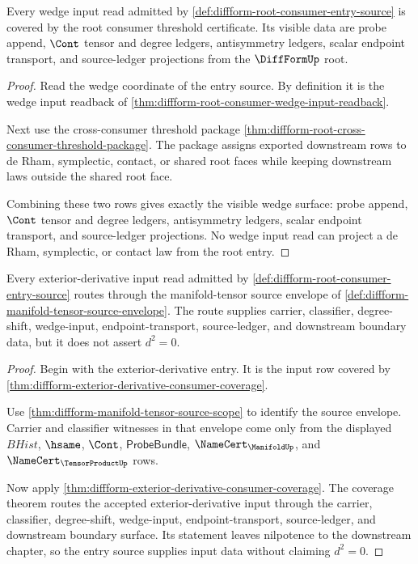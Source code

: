 \begin{theorem}
\label{thm:diffform-root-consumer-entry-wedge}
Every wedge input read admitted by
\autoref{def:diffform-root-consumer-entry-source} is covered by the root
consumer threshold certificate. Its visible data are probe append, $\Cont$
tensor and degree ledgers, antisymmetry ledgers, scalar endpoint transport,
and source-ledger projections from the $\DiffFormUp$ root.
\end{theorem}
\begin{proof}
Read the wedge coordinate of the entry source. By definition it is the wedge
input readback of
\autoref{thm:diffform-root-consumer-wedge-input-readback}.

Next use the cross-consumer threshold package
\autoref{thm:diffform-root-cross-consumer-threshold-package}. The package
assigns exported downstream rows to de Rham, symplectic, contact, or shared
root faces while keeping downstream laws outside the shared root face.

Combining these two rows gives exactly the visible wedge surface: probe
append, $\Cont$ tensor and degree ledgers, antisymmetry ledgers, scalar
endpoint transport, and source-ledger projections. No wedge input read can
project a de Rham, symplectic, or contact law from the root entry.
\end{proof}

\begin{theorem}
\label{thm:diffform-root-consumer-entry-derivative}
Every exterior-derivative input read admitted by
\autoref{def:diffform-root-consumer-entry-source} routes through the
manifold-tensor source envelope of
\autoref{def:diffform-manifold-tensor-source-envelope}. The route supplies
carrier, classifier, degree-shift, wedge-input, endpoint-transport,
source-ledger, and downstream boundary data, but it does not assert $d^2=0$.
\end{theorem}
\begin{proof}
Begin with the exterior-derivative entry. It is the input row covered by
\autoref{thm:diffform-exterior-derivative-consumer-coverage}.

Use \autoref{thm:diffform-manifold-tensor-source-scope} to identify the
source envelope. Carrier and classifier witnesses in that envelope come only
from the displayed $BHist$, $\hsame$, $\Cont$, $\mathsf{ProbeBundle}$,
$\NameCert_{\ManifoldUp}$, and $\NameCert_{\TensorProductUp}$ rows.

Now apply \autoref{thm:diffform-exterior-derivative-consumer-coverage}. The
coverage theorem routes the accepted exterior-derivative input through the
carrier, classifier, degree-shift, wedge-input, endpoint-transport,
source-ledger, and downstream boundary surface. Its statement leaves
nilpotence to the downstream chapter, so the entry source supplies input data
without claiming $d^2=0$.
\end{proof}

